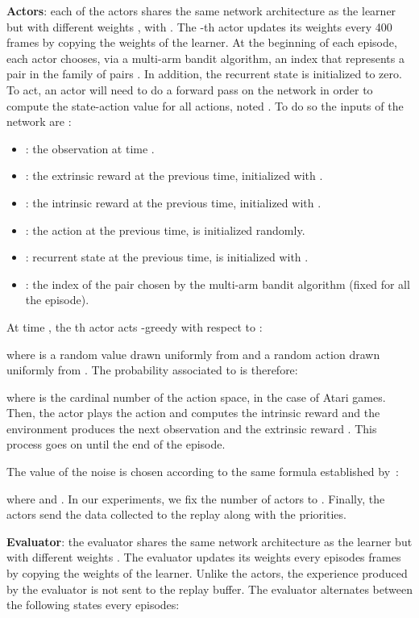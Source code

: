 \documentclass{article}
\begin{document}
{\bf Actors}: each of the  actors shares the same network architecture as the learner but with different weights , with . The -th actor updates its weights  every 400 frames by copying the weights of the learner. At the beginning of each episode, each actor chooses, via a multi-arm bandit algorithm, an index  that represents a pair  in the family of pairs . In addition, the recurrent state is initialized to zero.
To act, an actor will need to do a forward pass on the network in order to compute the state-action value for all actions, noted . To do so the inputs of the network are :
\begin{itemize}
    \item : the observation at time .
    \item : the extrinsic reward at the previous time, initialized with .
    \item : the intrinsic reward at the previous time, initialized with .
    \item : the action at the previous time,  is initialized randomly.
    \item : recurrent state at the previous time, is initialized with .
    \item : the index of the pair  chosen by the multi-arm bandit algorithm (fixed for all the episode).
\end{itemize}

At time , the th actor acts -greedy with respect to :

where  is a random value drawn uniformly from  and  a random action drawn uniformly from . The probability  associated to  is therefore:

where  is the cardinal number of the action space,  in the case of Atari games.
Then, the actor plays the action  and computes the intrinsic reward  and the environment produces the next observation  and the extrinsic reward . This process goes on until the end of the episode.

The value of the noise  is chosen according to the same formula established by~\citet{horgan2018distributed}:

where  and  . In our experiments, we fix the number of actors to . Finally, the actors send the data collected to the replay along with the priorities.

{\bf Evaluator}: the evaluator shares the same network architecture as the learner but with different weights . The evaluator updates its weights  every  episodes frames by copying the weights of the learner. Unlike the actors, the experience produced by the evaluator is not sent to the replay buffer. The evaluator alternates between the following states every  episodes:
\end{document}
